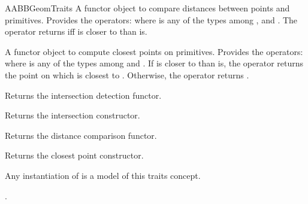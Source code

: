 \begin{ccRefConcept}{AABBGeomTraits}
{A functor object to compare distances between points and primitives.
Provides the operators:
where  is any of the types among ,  and . The operator returns  iff  is closer to  than  is.}

{A functor object to compute closest points on primitives.
Provides the operators:
where  is any of the types among  and . If  is closer to  than  is, the operator returns the point on  which is closest to . Otherwise, the operator returns .}

\ccCreation
{}  %

\ccOperations

{Returns the intersection detection functor.}

{Returns the intersection constructor.}

{Returns the distance comparison functor.}

{Returns the closest point constructor.}

\ccHasModels
Any instantiation of  is a model of this traits concept.

\ccSeeAlso

.

\end{ccRefConcept}

\ccRefPageEnd

